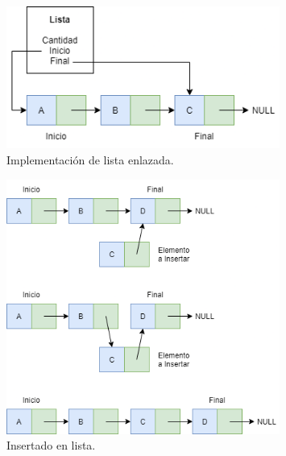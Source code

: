 \documentclass[titlepage,a4paper]{article}
\begin{document}
\begin{figure}[H]
\centering
\includegraphics[width=0.8\textwidth]{lista_general.png}
\caption{\label{fig:seq05}Implementación de lista enlazada.}
\end{figure}


\begin{figure}[H]
\centering
\includegraphics[width=0.8\textwidth]{lista_insercion.png}
\caption{\label{fig:seq06}Insertado en lista.}
\end{figure}
\end{document}
